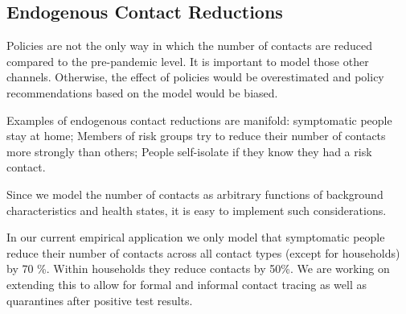 \subsection{Endogenous Contact Reductions}
\label{sec:endogenous_contact_reductions}

Policies are not the only way in which the number of contacts are reduced compared to
the pre-pandemic level. It is important to model those other channels. Otherwise, the
effect of policies would be overestimated and policy recommendations based on the model
would be biased.

Examples of endogenous contact reductions are manifold: symptomatic people stay at home;
Members of risk groups try to reduce their number of contacts more strongly than others;
People self-isolate if they know they had a risk contact.

Since we model the number of contacts as arbitrary functions of background
characteristics and health states, it is easy to implement such considerations.

In our current empirical application we only model that symptomatic people reduce their
number of contacts across all contact types (except for households) by 70 \%. Within
households they reduce contacts by 50\%. We are working on extending this to allow for
formal and informal contact tracing as well as quarantines after positive test results.
